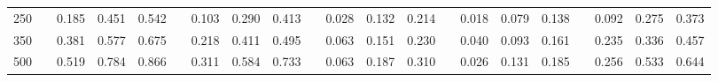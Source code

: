 % 
\begin{tabular}{ccccccccccccccccccccc}
  \hline
  \hline
250 &  & 0.185 & 0.451 & 0.542 &  & 0.103 & 0.290 & 0.413 &  & 0.028 & 0.132 & 0.214 &  & 0.018 & 0.079 & 0.138 &  & 0.092 & 0.275 & 0.373 \\ 
  350 &  & 0.381 & 0.577 & 0.675 &  & 0.218 & 0.411 & 0.495 &  & 0.063 & 0.151 & 0.230 &  & 0.040 & 0.093 & 0.161 &  & 0.235 & 0.336 & 0.457 \\ 
  500 &  & 0.519 & 0.784 & 0.866 &  & 0.311 & 0.584 & 0.733 &  & 0.063 & 0.187 & 0.310 &  & 0.026 & 0.131 & 0.185 &  & 0.256 & 0.533 & 0.644 \\ 
   \hline
\end{tabular}
